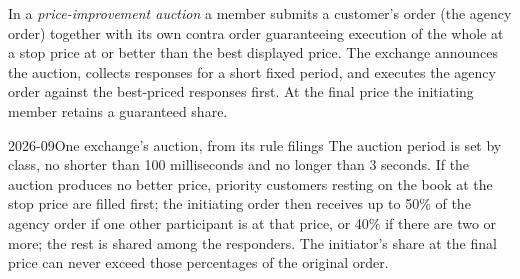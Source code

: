 \begin{definition}\label{def:m1:options-market-structure:auction}
In a \emph{price-improvement auction} a
member submits a customer's order (the agency order) together with its own
contra order guaranteeing execution of the whole at a stop price at or
better than the best displayed price. The exchange announces the auction,
collects responses for a short fixed period, and executes the agency order
against the best-priced responses first. At the final price the initiating
member retains a guaranteed share.
\end{definition}

\begin{dated}{2026-09}{One exchange's auction, from its rule filings}\label{dat:m1:options-market-structure:aim}
The auction period is set by class, no shorter than 100 milliseconds and no
longer than 3 seconds. If the auction produces no better price, priority
customers resting on the book at the stop price are filled first; the
initiating order then receives up to 50\% of the agency order if one other
participant is at that price, or 40\% if there are two or more; the rest is
shared among the responders. The initiator's share at the final price can
never exceed those percentages of the original order.
\end{dated}

\begin{omfigure}

\label{fig:m1:options-market-structure:timeline}
\end{omfigure}

